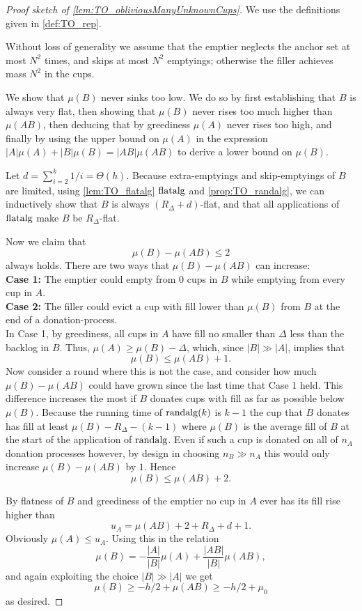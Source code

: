 \begin{proof}[Proof sketch of \cref{lem:TO_obliviousManyUnknownCups}] 
  We use the definitions given in \cref{def:TO_rep}.

Without loss of generality we assume that the emptier neglects
the anchor set at most $N^2$ times, and skips at most $N^2$
emptyings; otherwise the filler achieves mass $N^2$ in the cups.

We show that $\mu(B)$ never sinks too low. We do so by first
establishing that $B$ is always very flat, then showing that
$\mu(B)$ never rises too much higher than $\mu(AB)$, then
deducing that by greediness $\mu(A)$ never rises too high, and
finally by using the upper bound on $\mu(A)$ in the expression
$|A|\mu(A) + |B|\mu(B) = |AB|\mu(AB)$ to derive a lower bound on
$\mu(B)$.

Let $d = \sum_{i=2}^k 1/i = \Theta(h)$.
Because extra-emptyings and skip-emptyings of $B$ are limited,
using \cref{lem:TO_flatalg} $\operatorname{\text{\textup{flatalg}}}$ and
\cref{prop:TO_randalg}, we can inductively show that $B$ is
always $(R_\Delta + d)$-flat, and that all applications of
$\operatorname{\text{\textup{flatalg}}}$ make $B$ be $R_\Delta$-flat.

Now we claim that $$\mu(B) - \mu(AB) \le 2$$ always holds.
There are two ways that $\mu(B) -\mu(AB)$ can increase:\\
\textbf{Case 1:}
The emptier could empty from $0$ cups in $B$ while emptying
from every cup in $A$. \\
\textbf{Case 2:}
The filler could evict a cup with fill lower than $\mu(B)$ from
$B$ at the end of a donation-process. \\
In Case 1, by greediness, all cups in $A$ have fill no smaller
than $\Delta$ less than the backlog in $B$. Thus, $\mu(A) \ge
\mu(B) - \Delta$, which, since $|B|\gg |A|$, implies that 
$$\mu(B) \le \mu(AB) + 1.$$
Now consider a round where this is not the case, and consider how
much $\mu(B) - \mu(AB)$ could have grown since the last time that
Case 1 held. This difference increases the most if $B$ donates
cups with fill as far as possible below $\mu(B)$. Because the
running time of $\operatorname{\text{\textup{randalg}}}(k)$ is $k-1$ the cup that $B$ donates
has fill at least $\mu(B) - R_\Delta - (k-1)$ where $\mu(B)$ is
the average fill of $B$ at the start of the application of
$\operatorname{\text{\textup{randalg}}}$. Even if such a cup is donated on all of $n_A$
donation processes however, by design in choosing $n_B \gg n_A$
this would only increase $\mu(B)-\mu(AB)$ by $1$.
Hence 
$$\mu(B) \le \mu(AB) + 2.$$

By flatness of $B$ and greediness of the emptier no cup in $A$
ever has its fill rise higher than 
$$u_A = \mu(AB) + 2 + R_\Delta + d + 1.$$
Obviously $\mu(A)\le u_A$. Using this in the relation 
$$\mu(B) = -\frac{|A|}{|B|}\mu(A) + \frac{|AB|}{|B|}\mu(AB),$$
and again exploiting the choice $|B|\gg |A|$ we get
$$\mu(B) \ge -h/2 + \mu(AB) \ge -h/2 + \mu_0$$
as desired.


\end{proof}
